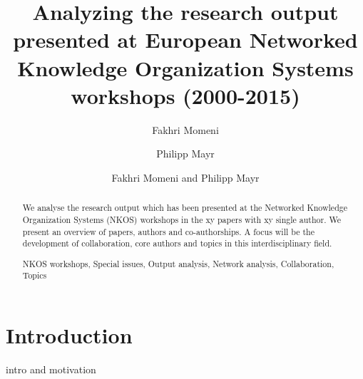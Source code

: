 \documentclass[runningheads,a4paper]{llncs}
\newcommand{\keywords}[1]{\par\addvspace\baselineskip
\noindent\keywordname\enspace\ignorespaces#1}
\begin{document}
\mainmatter  %

\title{Analyzing the research output presented at European Networked Knowledge Organization Systems workshops (2000-2015)}



%
%
\author{Fakhri Momeni%
	\and Philipp Mayr}
%

\author{Fakhri Momeni and Philipp Mayr}

%
%

\maketitle


\begin{abstract}		
We analyse the research output which has been presented at the Networked Knowledge Organization Systems (NKOS) workshops in the xy papers with xy single author. We present an overview of papers, authors and co-authorships. A focus will be the development of collaboration, core authors and topics in this interdisciplinary field.
 
\keywords{NKOS workshops, Special issues, Output analysis, Network analysis, Collaboration, Topics}
\end{abstract}


\section{Introduction}\label{intro}
intro and motivation %
\end{document}
